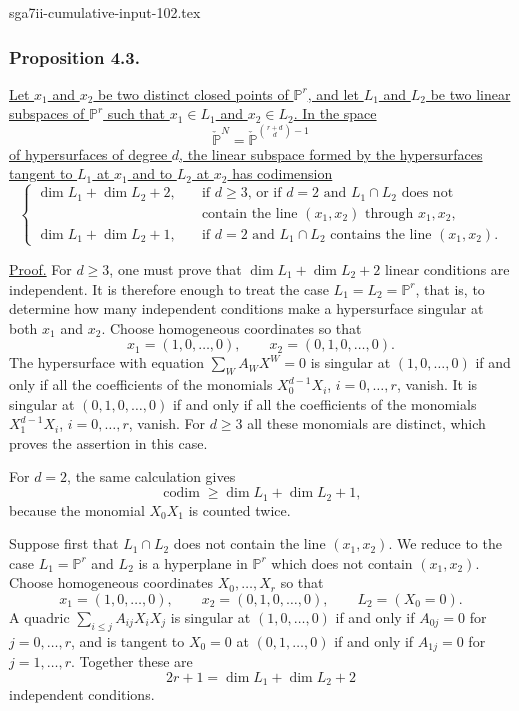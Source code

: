 \begin{filecontents*}{sga7ii-cumulative-input-102.tex}
\subsubsection*{Proposition 4.3.}
\underline{Let $x_1$ and $x_2$ be two distinct closed points of
$\mathbb P^r$, and let $L_1$ and $L_2$ be two linear subspaces of
$\mathbb P^r$ such that $x_1\in L_1$ and $x_2\in L_2$.  In the space}
\[
\check{\mathbb P}^{N}
=\check{\mathbb P}^{\binom{r+d}{d}-1}
\]
\underline{of hypersurfaces of degree $d$, the linear subspace formed
by the hypersurfaces tangent to $L_1$ at $x_1$ and to $L_2$ at $x_2$
has codimension}
\[
\left\{
\begin{aligned}
\dim L_1+\dim L_2+2,
 &\quad\text{if $d\geq3$, or if $d=2$ and $L_1\cap L_2$ does not}\\[-0.2ex]
 &\quad\text{contain the line $(x_1,x_2)$ through $x_1,x_2$},\\[1ex]
\dim L_1+\dim L_2+1,
 &\quad\text{if $d=2$ and $L_1\cap L_2$ contains the line $(x_1,x_2)$.}
\end{aligned}
\right.
\]

\noindent\underline{Proof.}
For $d\geq3$, one must prove that
$\dim L_1+\dim L_2+2$ linear conditions are independent.  It is
therefore enough to treat the case
$L_1=L_2=\mathbb P^r$, that is, to determine how many independent
conditions make a hypersurface singular at both $x_1$ and $x_2$.
Choose homogeneous coordinates so that
\[
x_1=(1,0,\ldots,0),\qquad x_2=(0,1,0,\ldots,0).
\]
The hypersurface with equation $\sum_W A_WX^W=0$ is singular at
$(1,0,\ldots,0)$ if and only if all the coefficients of the monomials
$X_0^{d-1}X_i$, $i=0,\ldots,r$, vanish.  It is singular at
$(0,1,0,\ldots,0)$ if and only if all the coefficients of the
monomials $X_1^{d-1}X_i$, $i=0,\ldots,r$, vanish.  For $d\geq3$ all
these monomials are distinct, which proves the assertion in this case.

For $d=2$, the same calculation gives
\[
\operatorname{codim}\geq\dim L_1+\dim L_2+1,
\]
because the monomial $X_0X_1$ is counted twice.

Suppose first that $L_1\cap L_2$ does not contain the line
$(x_1,x_2)$.  We reduce to the case $L_1=\mathbb P^r$ and $L_2$ is a
hyperplane in $\mathbb P^r$ which does not contain $(x_1,x_2)$.
Choose homogeneous coordinates $X_0,\ldots,X_r$ so that
\[
x_1=(1,0,\ldots,0),\qquad x_2=(0,1,0,\ldots,0),
\qquad L_2=(X_0=0).
\]
A quadric $\sum_{i\leq j}A_{ij}X_iX_j$ is singular at
$(1,0,\ldots,0)$ if and only if $A_{0j}=0$ for $j=0,\ldots,r$, and
is tangent to $X_0=0$ at $(0,1,\ldots,0)$ if and only if
$A_{1j}=0$ for $j=1,\ldots,r$.  Together these are
\[
2r+1=\dim L_1+\dim L_2+2
\]
independent conditions.


\end{filecontents*}
